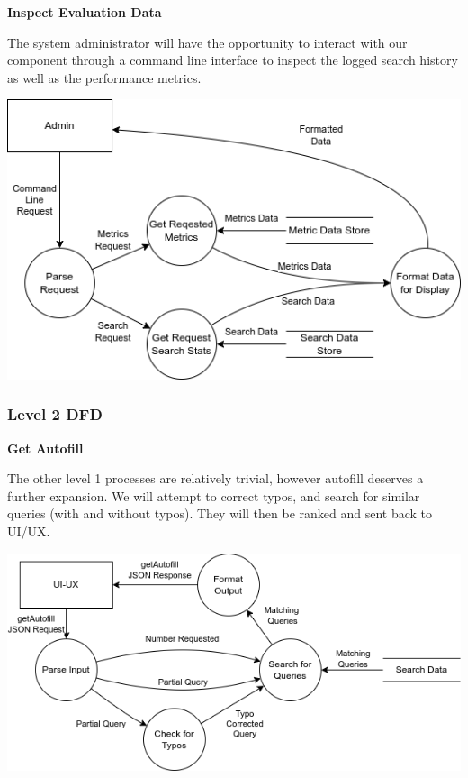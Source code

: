 \newpage
\textbf{Inspect Evaluation Data}

\medskip

The system administrator will have the opportunity to interact with our component through a command line interface to inspect the logged search history as well as the performance metrics. 

\begin{center}
  \includegraphics[scale=0.5]{DFDs/LowLevelDFDs-AdminView.drawio (1).png}
\end{center}

\subsubsection*{Level 2 DFD}

\textbf{Get Autofill}

\medskip

The other level 1 processes are relatively trivial, however autofill deserves a further expansion. We will attempt to correct typos, and search for similar queries (with and without typos). They will then be ranked and sent back to UI/UX.

\begin{center}
  \includegraphics[scale=0.5]{DFDs/LowLevelDFDs-GetAutofill.drawio (2).png}
\end{center}

